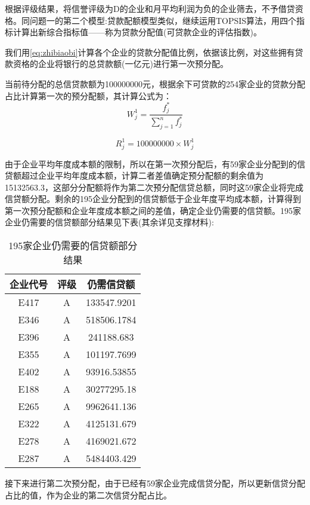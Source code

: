 \documentclass{cumcmthesis}
\begin{document}
根据评级结果，将信誉评级为D的企业和月平均利润为负的企业筛去，不予借贷资格。同问题一的第二个模型:贷款配额模型类似，继续运用TOPSIS算法，用四个指标计算出新综合指标值——称为贷款分配值(可贷款企业的评估指数)。

我们用\cref{eq:zhibiaobi}计算各个企业的贷款分配值比例，依据该比例，对这些拥有贷款资格的企业将银行的总贷款额(一亿元)进行第一次预分配。

当前待分配的总信贷款额为100000000元，根据余下可贷款的254家企业的贷款分配占比计算第一次的预分配额，其计算公式为：
\begin{equation}
W_j^1=\frac{f_j^*}{\sum_{j=1}^n f_j^*}
\end{equation}

\begin{equation}
R_j^1=100000000\times W_j^1
\end{equation}

由于企业平均年度成本额的限制，所以在第一次预分配后，有59家企业分配到的信贷额超过企业平均年度成本额，计算二者差值确定预分配额的剩余值为15132563.3，这部分分配额将作为第二次预分配信贷总额，同时这59家企业将完成信贷额分配。剩余的195企业分配到的信贷额低于企业年度平均成本额，计算得到第一次预分配额和企业年度成本额之间的差值，确定企业仍需要的信贷额。195家企业仍需要的信贷额部分结果见下表(其余详见支撑材料):

\begin{table}[H]   %
	\caption{195家企业仍需要的信贷额部分结果}\label{tab:25} \centering
	\begin{tabular}{ccc}
		\toprule[1.5pt]
企业代号 & 评级 & 仍需信贷额       \\
		\midrule[1pt]
E417 & A  & 133547.9201 \\
E346 & A  & 518506.1784 \\
E396 & A  & 241188.683  \\
E355 & A  & 101197.7699 \\
E402 & A  & 93916.53855 \\
E188 & A  & 30277295.18 \\
E265 & A  & 9962641.136 \\
E322 & A  & 4125131.679 \\
E278 & A  & 4169021.672 \\
E287 & A  & 5484403.429 \\
\bottomrule[1.5pt]
\end{tabular}
\end{table}

接下来进行第二次预分配，由于已经有59家企业完成信贷分配，所以更新信贷分配占比的值，作为企业的第二次信贷分配占比。
\end{document}
